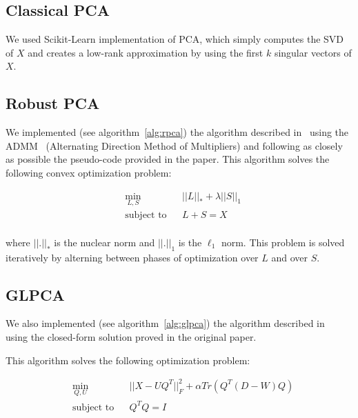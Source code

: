 \documentclass[sigconf]{acmart}
\begin{document}
\subsection{Classical PCA} 

We used Scikit-Learn implementation of PCA, which simply computes the SVD of $X$ and creates a low-rank approximation by using the first $k$ singular vectors of $X$.

\subsection{Robust PCA}

We implemented (see algorithm~\ref{alg:rpca}) the algorithm described in~\cite{rpca_paper} using the ADMM~\cite{admm_paper} (Alternating Direction Method of Multipliers) and following as closely as possible the pseudo-code provided in the paper.
  This algorithm solves the following convex optimization problem:

  \begin{equation*}
    \begin{aligned}
    & \underset{L, S}{\min}
    & & ||L||_* + \lambda ||S||_1 \\
    & \text{subject to}
    & & L + S = X \\
    \end{aligned}
  \end{equation*}

  where $||.||_*$ is the nuclear norm and $||.||_1$ is the $\ell_1$ norm. This problem is solved iteratively by alterning between phases of optimization over $L$ and over $S$.
  
\subsection{GLPCA}

We also implemented (see algorithm~\ref{alg:glpca}) the algorithm described in~\cite{glpca_paper} using the closed-form solution proved in the original paper.
  
  This algorithm solves the following optimization problem:

  \begin{equation*}
    \begin{aligned}
    & \underset{Q, U}{\min}
    & & ||X - UQ^T||_F^2 + \alpha Tr(Q^T (D-W) Q) \\
    & \text{subject to}
    & & Q^TQ = I \\
    \end{aligned}
  \end{equation*}
\end{document}
